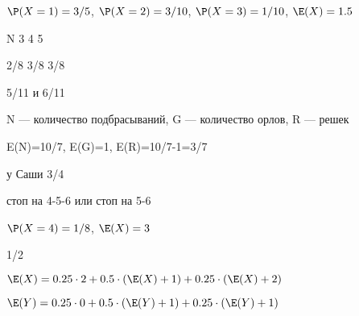 \begin{solution}{1.1}
  $\P(X=1)=3/5$, $\P(X=2)=3/10$, $\P(X=3)=1/10$, $\E(X)=1.5$
\end{solution}
\begin{solution}{1.2}
\end{solution}
\begin{solution}{1.3}
\end{solution}
\begin{solution}{1.4}
   N 3 4 5

  2/8 3/8 3/8
\end{solution}
\begin{solution}{1.5}
\end{solution}
\begin{solution}{1.6}
  5/11 и 6/11
\end{solution}
\begin{solution}{1.7}
  N — количество подбрасываний, G — количество орлов, R — решек

  E(N)=10/7, E(G)=1, E(R)=10/7-1=3/7
\end{solution}
\begin{solution}{1.8}
\end{solution}
\begin{solution}{1.9}
  у Саши 3/4
\end{solution}
\begin{solution}{1.10}
  стоп на 4-5-6 или стоп на 5-6
\end{solution}
\begin{solution}{1.11}
  $\P(X=4)=1/8$, $\E(X)=3$
\end{solution}
\begin{solution}{1.12}
\end{solution}
\begin{solution}{2.1}
\end{solution}
\begin{solution}{2.2}
\end{solution}
\begin{solution}{2.3}
\end{solution}
\begin{solution}{2.4}
\end{solution}
\begin{solution}{2.5}
\end{solution}
\begin{solution}{2.6}
  1/2
\end{solution}
\begin{solution}{2.7}
  $\E(X)=0.25\cdot 2 + 0.5\cdot (\E(X)+1)+0.25\cdot (\E(X)+2)$

  $\E(Y)=0.25\cdot 0 + 0.5\cdot (\E(Y)+1)+0.25\cdot (\E(Y)+1)$
\end{solution}

